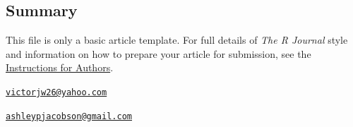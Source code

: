 \hypertarget{summary}{%
\subsection{Summary}\label{summary}}

This file is only a basic article template. For full details of
\emph{The R Journal} style and information on how to prepare your
article for submission, see the
\href{https://journal.r-project.org/share/author-guide.pdf}{Instructions
for Authors}.




\address{%
Victor Wilson\\
California Polytechnic State University, San Luis Obispo - Statistics
Department\\
\\
}
\href{mailto:victorjw26@yahoo.com}{\nolinkurl{victorjw26@yahoo.com}}

\address{%
Ashley Jacobson\\
California Polytechnic State University, San Luis Obispo - Statistics
Department\\
\\
}
\href{mailto:ashleypjacobson@gmail.com}{\nolinkurl{ashleypjacobson@gmail.com}}

